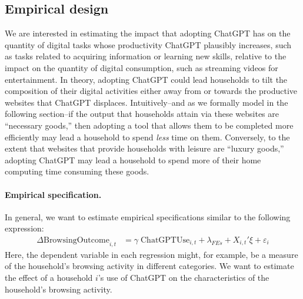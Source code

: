 \documentclass[12pt]{article}
\begin{document}
\subsection{Empirical design}


We are interested in estimating the impact that adopting ChatGPT has on the quantity of digital tasks whose productivity ChatGPT plausibly increases, such as tasks related to acquiring information or learning new skills, relative to the impact on the quantity of digital consumption, such as streaming videos for entertainment. In theory, adopting ChatGPT could lead households to tilt the composition of their digital activities either away from or towards the productive websites that ChatGPT displaces. Intuitively--and as we formally model in the following section--if the output that households attain via these websites are ``necessary goods,'' then adopting a tool that allows them to be completed more efficiently may lead a household to spend \textit{less} time on them. Conversely, to the extent that websites that provide households with leisure are ``luxury goods,'' adopting ChatGPT may lead a household to spend more of their home computing time consuming these goods. 

\paragraph{Empirical specification.} In general, we want to estimate empirical specifications similar to the following expression:
\begin{align}
  \Delta\text{BrowsingOutcome}_{i,t} &= \gamma\; \text{ChatGPTUse}_{i,t}  + \lambda_{FEs} + X_{i,t}'\xi + \varepsilon_{i}  \label{eq:2ndstage}
\end{align}
Here, the dependent variable in each regression might, for example, be a measure of the household's browsing activity in different categories. We want to estimate the effect of a household $i$'s use of ChatGPT on the characteristics of the household's browsing activity.
\end{document}
